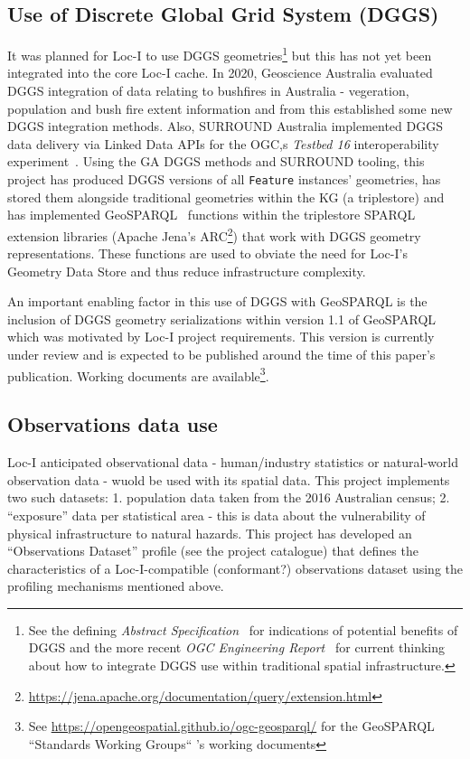 \documentclass[runningheads]{llncs}
\begin{document}
\subsection{Use of Discrete Global Grid System (DGGS)}
It was planned for Loc-I to use DGGS geometries\footnote{See the defining \textit{Abstract Specification}~\cite{purss_topic_2017} for indications of potential benefits of 
DGGS and the more recent \textit{OGC Engineering Report}~\cite{gibb_ogc_2021} for current thinking about how to integrate DGGS use within traditional spatial 
infrastructure.} but this has not yet been integrated into the core Loc-I cache. In 2020, Geoscience Australia evaluated DGGS integration of data
relating to bushfires in Australia - vegeration, population and bush fire extent information and from this established some new DGGS integration methods. Also, SURROUND Australia
implemented DGGS data delivery via Linked Data APIs for the OGC,s \textit{Testbed 16} interoperability experiment~\cite{gibb_ogc_2021}.
Using the GA DGGS methods and SURROUND tooling, this project has produced DGGS versions of all \texttt{Feature} instances' 
geometries, has stored them alongside traditional geometries within the KG (a triplestore) and has implemented GeoSPARQL~\cite{open2012ogc} functions
within the triplestore SPARQL extension libraries (Apache Jena's ARC\footnote{\url{https://jena.apache.org/documentation/query/extension.html}}) that work with 
DGGS geometry representations. These functions are used to obviate the need for Loc-I's Geometry Data Store and thus reduce infrastructure complexity.

An important enabling factor in this use of DGGS with GeoSPARQL is the inclusion of DGGS geometry serializations within version 1.1 of GeoSPARQL which was motivated
by Loc-I project requirements. This version is currently under review and is expected to be published around the time of this paper's publication. Working documents 
are available\footnote{See \url{https://opengeospatial.github.io/ogc-geosparql/} for the GeoSPARQL ``Standards Working Groups`` 's working documents}.

\subsection{Observations data use}
Loc-I anticipated observational data - human/industry statistics or natural-world observation data - wuold be used with its spatial data. This project
implements two such datasets: 1. population data taken from the 2016 Australian census; 2. ``exposure'' data per statistical area - this is data about the vulnerability
of physical infrastructure to natural hazards. This project has developed an ``Observations Dataset'' profile (see the project catalogue) that defines the characteristics of a Loc-I-compatible (conformant?)
observations dataset using the profiling mechanisms mentioned above.
\end{document}
